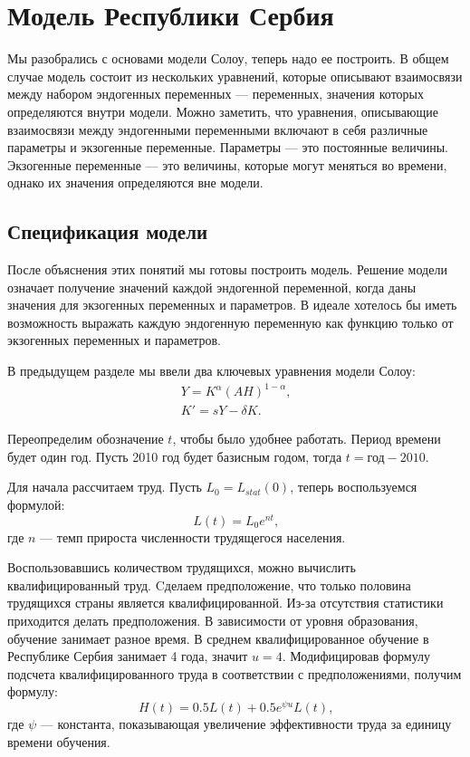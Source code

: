 \chapter{Модель Республики Сербия}

Мы разобрались с основами модели Солоу, теперь надо ее построить.
В общем случае модель состоит из нескольких уравнений, которые описывают взаимосвязи между набором эндогенных переменных --- переменных, значения которых определяются внутри модели.
Можно заметить, что уравнения, описывающие взаимосвязи между эндогенными переменными включают в себя различные параметры и экзогенные переменные.
Параметры --- это постоянные величины.
Экзогенные переменные --- это величины, которые могут меняться во времени, однако их значения определяются вне модели.

\section{Спецификация модели}

После объяснения этих понятий мы готовы построить модель.
Решение модели означает получение значений каждой эндогенной переменной, когда даны значения для экзогенных переменных и параметров.
В идеале хотелось бы иметь возможность выражать каждую эндогенную переменную как функцию только от экзогенных переменных и параметров.

В предыдущем разделе мы ввели два ключевых уравнения модели Солоу:
\begin{align*}
	Y=K^{\alpha}(AH)^{1-\alpha}\text{,}\\
	K'=sY - \delta K \text{.}
\end{align*}

Переопределим обозначение $t$, чтобы было удобнее работать.
Период времени будет один год.
Пусть 2010 год будет базисным годом, тогда $t = \text{год} - 2010$.

Для начала рассчитаем труд.
Пусть $L_0 = L_{stat}(0)$, теперь воспользуемся формулой:
\begin{equation*}
	L(t) = L_0 e^{nt}\text{,}
\end{equation*}
где $n$ --- темп прироста численности трудящегося населения.

Воспользовавшись количеством трудящихся, можно вычислить квалифицированный труд.
Cделаем предположение, что только половина трудящихся страны является квалифицированной.
Из-за отсутствия статистики приходится делать предположения.
В зависимости от уровня образования, обучение занимает разное время.
В среднем квалифицированное обучение в Республике Сербия занимает 4 года, значит $u = 4$.
Модифицировав формулу подсчета квалифицированного труда в соответствии с предположениями, получим формулу:
\begin{equation*}
H(t) = 0.5L(t) + 0.5 e^{\psi u}L(t)\text{,}
\end{equation*}
где $\psi$ --- константа, показывающая увеличение эффективности труда за единицу времени обучения.

